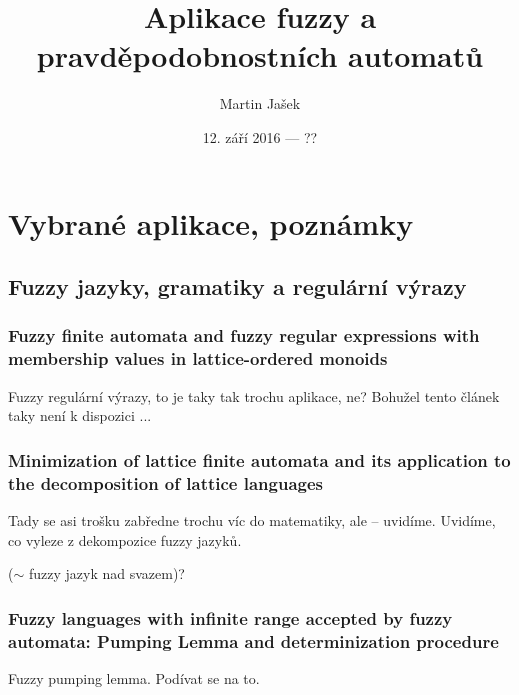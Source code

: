 \documentclass[a4paper,10pt]{article}
\title{Aplikace fuzzy a pravděpodobnostních automatů}
\author{Martin Jašek}
\date{12. září 2016 --- ??}
\begin{document}
\maketitle
\tableofcontents

\newpage

\section{Vybrané aplikace, poznámky}

\subsection{Fuzzy jazyky, gramatiky a regulární výrazy}


\subsubsection*{Fuzzy finite automata and fuzzy regular expressions with membership values in lattice-ordered monoids \cite{LiPed-FuzzFinAutFuzzRegExMembValLattOrdMon}}

Fuzzy regulární výrazy, to je taky tak trochu aplikace, ne? Bohužel tento článek taky není k dispozici ...


\subsubsection*{Minimization of lattice finite automata and its application to the decomposition of lattice languages \cite{LiPed-MinLattFinAutAppDecoLattLang}}

Tady se asi trošku zabředne trochu víc do matematiky, ale -- uvidíme. Uvidíme, co vyleze z dekompozice fuzzy jazyků.

\begin{definition}
  ($\sim$ fuzzy jazyk nad svazem)?
\end{definition}

\subsubsection*{Fuzzy languages with infinite range accepted by fuzzy automata: Pumping Lemma and determinization procedure \cite{GonGar-FuzzLangInfRanAccGuzzAutPumLemDetProc}}

Fuzzy pumping lemma. Podívat se na to.
\end{document}
